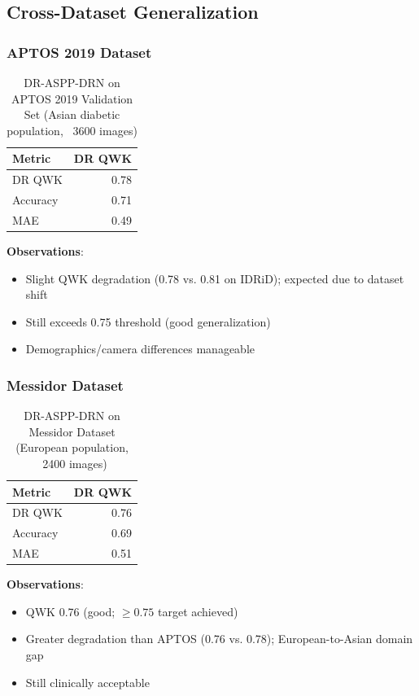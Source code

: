 \subsection{Cross-Dataset Generalization}

\subsubsection{APTOS 2019 Dataset}

\begin{table}[H]
\centering
\small
\caption{DR-ASPP-DRN on APTOS 2019 Validation Set (Asian diabetic population, ~3600 images)}
\begin{tabular}{|l|r|}
\hline
\textbf{Metric} & \textbf{DR QWK} \\
\hline
DR QWK & 0.78 \\
Accuracy & 0.71 \\
MAE & 0.49 \\
\hline
\end{tabular}
\end{table}

\textbf{Observations}:
\begin{itemize}
    \item Slight QWK degradation (0.78 vs. 0.81 on IDRiD); expected due to dataset shift
    \item Still exceeds 0.75 threshold (good generalization)
    \item Demographics/camera differences manageable
\end{itemize}

\subsubsection{Messidor Dataset}

\begin{table}[H]
\centering
\small
\caption{DR-ASPP-DRN on Messidor Dataset (European population, ~2400 images)}
\begin{tabular}{|l|r|}
\hline
\textbf{Metric} & \textbf{DR QWK} \\
\hline
DR QWK & 0.76 \\
Accuracy & 0.69 \\
MAE & 0.51 \\
\hline
\end{tabular}
\end{table}

\textbf{Observations}:
\begin{itemize}
    \item QWK 0.76 (good; $\geq 0.75$ target achieved)
    \item Greater degradation than APTOS (0.76 vs. 0.78); European-to-Asian domain gap
    \item Still clinically acceptable
\end{itemize}

